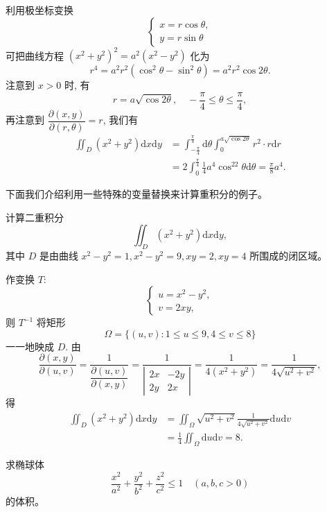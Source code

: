 \documentclass[UTF8,12pt,a4paper,fontset=fandol]{ctexart}
\begin{document}
\begin{solve}\quad 利用极坐标变换
\[
  \begin{cases}
    x=r\cos\theta,\\
    y=r\sin\theta
  \end{cases}
\]
可把曲线方程 $(x^2+y^2)^2=a^2(x^2-y^2)$ 化为
\[
  r^4=a^2r^2(\cos^2\theta-\sin^2\theta)=a^2r^2\cos2\theta.
\]
注意到 $x>0$ 时, 有
\[
  r=a\sqrt{\cos2\theta},\quad -\frac\pi4\leqslant\theta\leqslant\frac\pi4,
\]
再注意到 $\dfrac{\partial(x,y)}{\partial(r,\theta)}=r$, 我们有
\[
\begin{aligned}
  \iint_D(x^2+y^2)\mathrm dx\mathrm dy
  &=\int_{-\frac\pi4}^{\frac\pi4}\mathrm d\theta
  \int_0^{a\sqrt{\cos2\theta}}r^2\cdot r\mathrm dr\\
  &=2\int_0^{\frac\pi4}\frac14a^4\cos^22\theta\mathrm d\theta
  =\frac\pi8a^4.
\end{aligned}
\]

下面我们介绍利用一些特殊的变量替换来计算重积分的例子。

\end{solve}
\begin{example}\label{course-example-15-4-3}\quad 计算二重积分
\[
  \iint_D(x^2+y^2)\mathrm dx\mathrm dy,
\]
其中 $D$ 是由曲线 $x^2-y^2=1,x^2-y^2=9,xy=2,xy=4$ 所围成的闭区域。

\end{example}
\begin{solve}\quad 作变换 $T$:
\[
  \begin{cases}
    u=x^2-y^2,\\
    v=2xy,
  \end{cases}
\]
则 $T^{-1}$ 将矩形
\[
  \Omega=\{(u,v):1\leqslant u\leqslant9,4\leqslant v\leqslant8\}
  \]
一一地映成 $D$. 由
\[
  \frac{\partial(x,y)}{\partial(u,v)}
  =\frac1{\dfrac{\partial(u,v)}{\partial(x,y)}}
  =\frac1{\left|\begin{matrix}2x&-2y\\2y&2x\end{matrix}\right|}
  =\frac1{4(x^2+y^2)}
  =\frac1{4\sqrt{u^2+v^2}},
\]
得
\[
\begin{aligned}
  \iint_D(x^2+y^2)\mathrm dx\mathrm dy
  &=\iint_\Omega\sqrt{u^2+v^2}\frac1{4\sqrt{u^2+v^2}}\mathrm du\mathrm dv\\
  &=\frac14\iint_\Omega\mathrm du\mathrm dv=8.
\end{aligned}
\]

\end{solve}
\begin{example}\label{course-example-15-4-4}\quad 求椭球体
\[
  \frac{x^2}{a^2}+\frac{y^2}{b^2}+\frac{z^2}{c^2}\leqslant1\quad(a,b,c>0)
\]
的体积。

\end{example}
\end{document}
